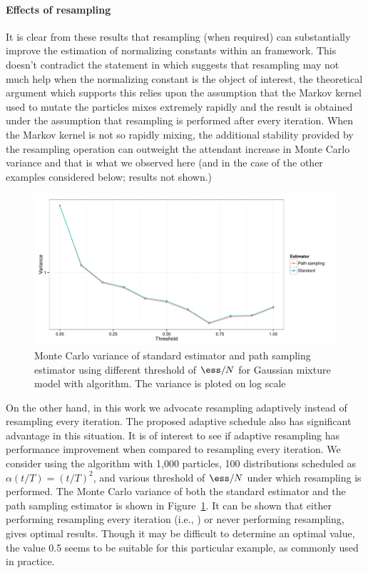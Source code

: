 \paragraph{Effects of resampling} It is clear from these results that
resampling (when required) can substantially improve the estimation of
normalizing constants within an \smc framework. This doesn't contradict the
statement in \cite{DelMoral:2006hc} which suggests that resampling may not
much help when the normalizing constant is the object of interest, the
theoretical argument which supports this relies upon the assumption that the
Markov kernel used to mutate the particles mixes extremely rapidly and the
result is obtained under the assumption that resampling is performed after
every iteration. When the Markov kernel is not so rapidly mixing, the
additional stability provided by the resampling operation can outweight the
attendant increase in Monte Carlo variance and that is what we observed here
(and in the case of the other examples considered below; results not shown.)

\begin{figure}
  \includegraphics[width=\linewidth]{fig/GMM_Resample}
  \caption{Monte Carlo variance of standard estimator and path sampling
    estimator using different threshold of $\ess/N$ for Gaussian mixture model
    with \smc[2] algorithm. The variance is ploted on log scale}
  \label{fig:gmm resample}
\end{figure}

On the other hand, in this work we advocate resampling adaptively instead of
resampling every iteration. The proposed adaptive schedule also has
significant advantage in this situation. It is of interest to see if adaptive
resampling has performance improvement when compared to resampling every
iteration. We consider using the \smc[2] algorithm with 1,000 particles, 100
distributions scheduled as $\alpha(t/T) = (t/T)^2$, and various threshold of
$\ess/N$ under which resampling is performed. The Monte Carlo variance of both
the standard estimator and the path sampling estimator is shown in
Figure~\ref{fig:gmm resample}. It can be shown that either performing
resampling every iteration (i.e., \ais) or never performing resampling, gives
optimal results. Though it may be difficult to determine an optimal value, the
value 0.5 seems to be suitable for this particular example, as commonly used
in practice.

